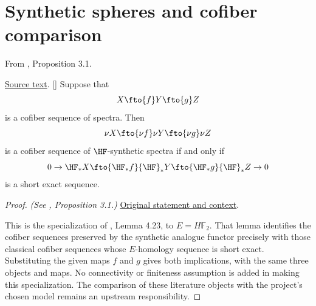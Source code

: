 \section{Synthetic spheres and cofiber comparison}


\begin{proposition}
\label{paper:3.1}
From \cite{LWX126}, Proposition 3.1.\par

\href{paper/main.tex.html#L759}{Source text}.
[{\cite[Lemma 4.23]{Pst}}]\label{prop:1f7950df}
    Suppose that
    $$X\fto{f} Y\fto{g} Z$$
    is a cofiber sequence of spectra. Then
    $$\nu X\fto{\nu f}\nu Y\fto{\nu g} \nu Z$$
    is a cofiber sequence of ${\HF}$-synthetic spectra if and only if
    $$0\to {\HF}_*X\fto{{\HF}_*f} {\HF}_*Y\fto{{\HF}_*g} {\HF}_*Z\to 0$$
    is a short exact sequence.



\end{proposition}
\begin{proof}
\textit{(See \cite{LWX126}, Proposition 3.1.)} \href{paper/main.tex.html#L759}{Original statement and context}.

This is the specialization of \cite{Pst}, Lemma 4.23, to $E=H\mathbb F_2$. That lemma identifies the cofiber sequences preserved by the synthetic analogue functor precisely with those classical cofiber sequences whose $E$-homology sequence is short exact. Substituting the given maps $f$ and $g$ gives both implications, with the same three objects and maps. No connectivity or finiteness assumption is added in making this specialization. The comparison of these literature objects with the project's chosen model remains an upstream responsibility.
\end{proof}

